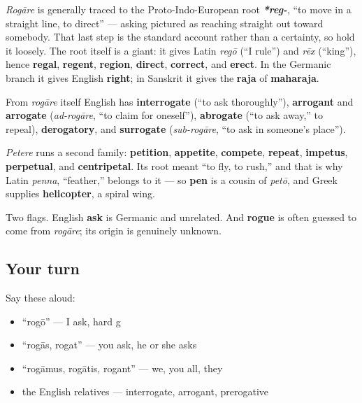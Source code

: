 \begin{cousinweb}
\emph{Rogāre} is generally traced to the Proto-Indo-European root \emph{\textbf{*reg-}}, \textquotedblleft{}to move in a straight line, to direct\textquotedblright{} — asking pictured as reaching straight out toward somebody. That last step is the standard account rather than a certainty, so hold it loosely. The root itself is a giant: it gives Latin \emph{regō} (\textquotedblleft{}I rule\textquotedblright{}) and \emph{rēx} (\textquotedblleft{}king\textquotedblright{}), hence \textbf{regal}, \textbf{regent}, \textbf{region}, \textbf{direct}, \textbf{correct}, and \textbf{erect}. In the Germanic branch it gives English \textbf{right}; in Sanskrit it gives the \textbf{raja} of \textbf{maharaja}.

From \emph{rogāre} itself English has \textbf{interrogate} (\textquotedblleft{}to ask thoroughly\textquotedblright{}), \textbf{arrogant} and \textbf{arrogate} (\emph{ad-rogāre}, \textquotedblleft{}to claim for oneself\textquotedblright{}), \textbf{abrogate} (\textquotedblleft{}to ask away,\textquotedblright{} to repeal), \textbf{derogatory}, and \textbf{surrogate} (\emph{sub-rogāre}, \textquotedblleft{}to ask in someone's place\textquotedblright{}).

\emph{Petere} runs a second family: \textbf{petition}, \textbf{appetite}, \textbf{compete}, \textbf{repeat}, \textbf{impetus}, \textbf{perpetual}, and \textbf{centripetal}. Its root meant \textquotedblleft{}to fly, to rush,\textquotedblright{} and that is why Latin \emph{penna}, \textquotedblleft{}feather,\textquotedblright{} belongs to it — so \textbf{pen} is a cousin of \emph{petō}, and Greek supplies \textbf{helicopter}, a spiral wing.

Two flags. English \textbf{ask} is Germanic and unrelated. And \textbf{rogue} is often guessed to come from \emph{rogāre}; its origin is genuinely unknown.
\end{cousinweb}

\subsection*{Your turn}
Say these aloud:

\begin{itemize}
\raggedright
  \item \textquotedblleft{}rogō\textquotedblright{} — I ask, hard g
  \item \textquotedblleft{}rogās, rogat\textquotedblright{} — you ask, he or she asks
  \item \textquotedblleft{}rogāmus, rogātis, rogant\textquotedblright{} — we, you all, they
  \item the English relatives — interrogate, arrogant, prerogative
\end{itemize}

